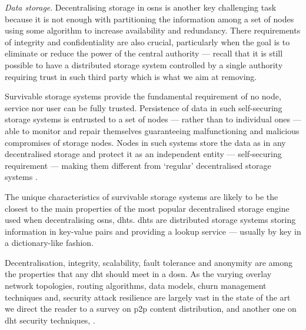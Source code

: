 \textit{Data storage}. Decentralising storage in \acp{osn} is another key challenging 
task because it is not enough with partitioning the information among a set of nodes 
using some algorithm to increase availability and redundancy. There requirements 
of integrity and confidentiality are also crucial, particularly when the goal is 
to eliminate or reduce the power of the central authority --- recall that it is 
still possible to have a distributed storage system controlled by a single authority 
requiring trust in such third party which is what we aim at removing.

Survivable storage systems provide the fundamental requirement of no node, service 
nor user can be fully trusted. Persistence of data in such self-securing storage 
systems is entrusted to a set of nodes --- rather than to individual ones --- able 
to monitor and repair themselves guaranteeing malfunctioning and malicious compromises 
of storage nodes. Nodes in such systems store the data as in any decentralised storage 
and protect it as an independent entity --- self-securing requirement --- making 
them different from `regular' decentralised storage systems \cite{WylieBSGKK00}.
 
The unique characteristics of survivable storage systems are likely to be the closest 
to the main properties of the most popular decentralised storage engine used when 
decentralising \acp{osn}, \acp{dht}. \acp{dht} are distributed storage systems storing 
information in key-value pairs and providing a lookup service --- usually by key 
in a dictionary-like fashion.

Decentralisation, integrity, scalability, fault tolerance and anonymity are among 
the properties that any \ac{dht} should meet in a \ac{dosn}. As the varying overlay 
network topologies, routing algorithms, data models, churn management techniques and, 
security attack resilience are largely vast in the state of the art we direct the 
reader to a survey on \ac{p2p} content distribution, \cite{Androutsellis-TheotokisSLS10} 
and another one on \ac{dht} security techniques, \cite{UrdanetaPS11}.





